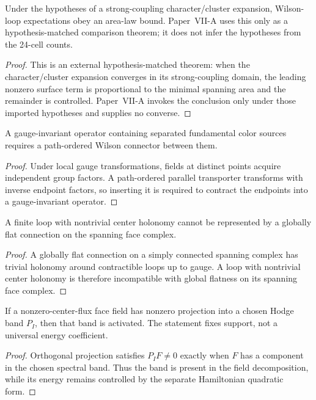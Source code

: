 \documentclass[12pt,a4paper]{article}
\begin{document}
\begin{theorem}
\label{p10:thm:strong-coupling-area-law-import}
Under the hypotheses of a strong-coupling character/cluster expansion, Wilson-loop expectations obey an area-law bound.  Paper~VII-A uses this only as a hypothesis-matched comparison theorem; it does not infer the hypotheses from the 24-cell counts.
\end{theorem}
\begin{proof}
This is an external hypothesis-matched theorem: when the character/cluster expansion converges in its strong-coupling domain, the leading nonzero surface term is proportional to the minimal spanning area and the remainder is controlled.  Paper~VII-A invokes the conclusion only under those imported hypotheses and supplies no converse.
\end{proof}

\begin{theorem}
\label{p10:thm:separated-color-readout-wilson-connector}
A gauge-invariant operator containing separated fundamental color sources requires a path-ordered Wilson connector between them.
\end{theorem}
\begin{proof}
Under local gauge transformations, fields at distinct points acquire independent group factors.  A path-ordered parallel transporter transforms with inverse endpoint factors, so inserting it is required to contract the endpoints into a gauge-invariant operator.
\end{proof}

\begin{lemma}
\label{p10:lem:nonzero-center-flux-nonflat-face}
A finite loop with nontrivial center holonomy cannot be represented by a globally flat connection on the spanning face complex.
\end{lemma}
\begin{proof}
A globally flat connection on a simply connected spanning complex has trivial holonomy around contractible loops up to gauge.  A loop with nontrivial center holonomy is therefore incompatible with global flatness on its spanning face complex.
\end{proof}

\begin{lemma}
\label{p10:lem:flux-face-scalar-shell-activation}
If a nonzero-center-flux face field has nonzero projection into a chosen Hodge band \(P_I\), then that band is activated.  The statement fixes support, not a universal energy coefficient.
\end{lemma}
\begin{proof}
Orthogonal projection satisfies $P_I F\ne0$ exactly when $F$ has a component in the chosen spectral band.  Thus the band is present in the field decomposition, while its energy remains controlled by the separate Hamiltonian quadratic form.
\end{proof}
\end{document}

